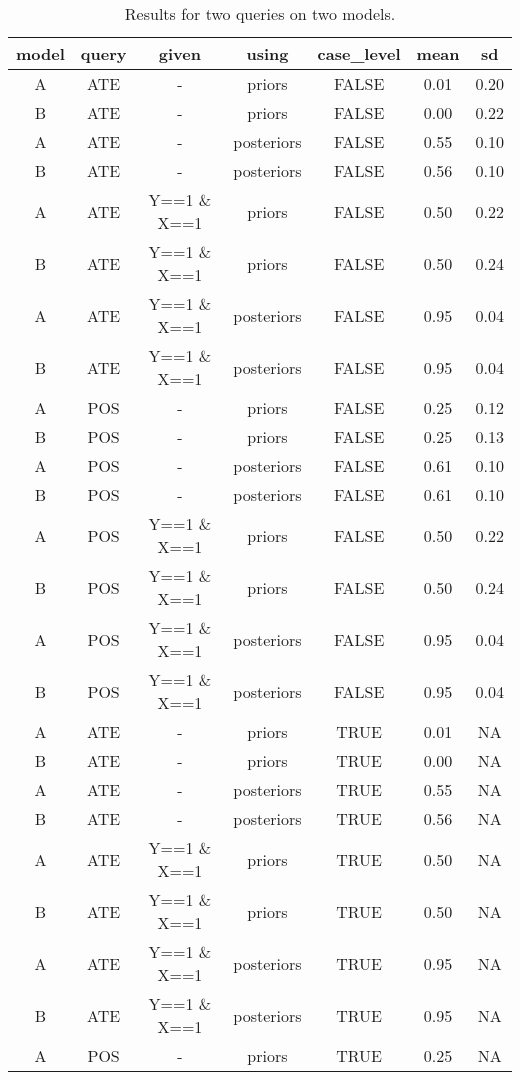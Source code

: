 \documentclass[
  11pt,
  article]{jss}
\begin{document}
\hypertarget{tbl-batch-query}{}
\begin{longtable}[t]{ccccccc}
\caption{\label{tbl-batch-query}Results for two queries on two models. }\tabularnewline

\toprule
model & query & given & using & case\_level & mean & sd\\
\midrule
A & ATE & - & priors & FALSE & 0.01 & 0.20\\
B & ATE & - & priors & FALSE & 0.00 & 0.22\\
A & ATE & - & posteriors & FALSE & 0.55 & 0.10\\
B & ATE & - & posteriors & FALSE & 0.56 & 0.10\\
A & ATE & Y==1 \& X==1 & priors & FALSE & 0.50 & 0.22\\
\addlinespace
B & ATE & Y==1 \& X==1 & priors & FALSE & 0.50 & 0.24\\
A & ATE & Y==1 \& X==1 & posteriors & FALSE & 0.95 & 0.04\\
B & ATE & Y==1 \& X==1 & posteriors & FALSE & 0.95 & 0.04\\
A & POS & - & priors & FALSE & 0.25 & 0.12\\
B & POS & - & priors & FALSE & 0.25 & 0.13\\
\addlinespace
A & POS & - & posteriors & FALSE & 0.61 & 0.10\\
B & POS & - & posteriors & FALSE & 0.61 & 0.10\\
A & POS & Y==1 \& X==1 & priors & FALSE & 0.50 & 0.22\\
B & POS & Y==1 \& X==1 & priors & FALSE & 0.50 & 0.24\\
A & POS & Y==1 \& X==1 & posteriors & FALSE & 0.95 & 0.04\\
\addlinespace
B & POS & Y==1 \& X==1 & posteriors & FALSE & 0.95 & 0.04\\
A & ATE & - & priors & TRUE & 0.01 & NA\\
B & ATE & - & priors & TRUE & 0.00 & NA\\
A & ATE & - & posteriors & TRUE & 0.55 & NA\\
B & ATE & - & posteriors & TRUE & 0.56 & NA\\
\addlinespace
A & ATE & Y==1 \& X==1 & priors & TRUE & 0.50 & NA\\
B & ATE & Y==1 \& X==1 & priors & TRUE & 0.50 & NA\\
A & ATE & Y==1 \& X==1 & posteriors & TRUE & 0.95 & NA\\
B & ATE & Y==1 \& X==1 & posteriors & TRUE & 0.95 & NA\\
A & POS & - & priors & TRUE & 0.25 & NA\\

\end{longtable}
\end{document}
